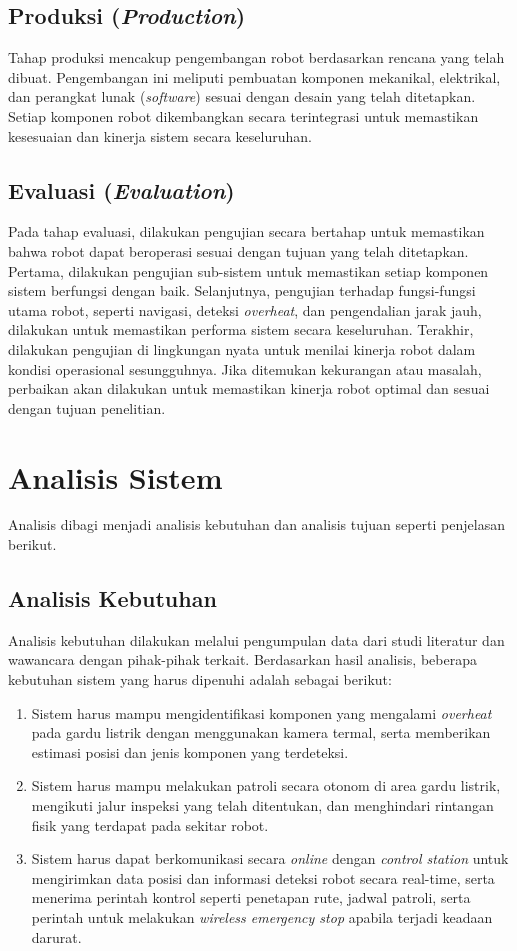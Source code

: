 \subsection{Produksi (\emph{Production})}
Tahap produksi mencakup pengembangan robot berdasarkan rencana yang telah dibuat. Pengembangan ini meliputi pembuatan komponen mekanikal, elektrikal, dan perangkat lunak (\emph{software}) sesuai dengan desain yang telah ditetapkan. Setiap komponen robot dikembangkan secara terintegrasi untuk memastikan kesesuaian dan kinerja sistem secara keseluruhan.

\subsection{Evaluasi (\emph{Evaluation})}
Pada tahap evaluasi, dilakukan pengujian secara bertahap untuk memastikan bahwa robot dapat beroperasi sesuai dengan tujuan yang telah ditetapkan. Pertama, dilakukan pengujian sub-sistem untuk memastikan setiap komponen sistem berfungsi dengan baik. Selanjutnya, pengujian terhadap fungsi-fungsi utama robot, seperti navigasi, deteksi \emph{overheat}, dan pengendalian jarak jauh, dilakukan untuk memastikan performa sistem secara keseluruhan. Terakhir, dilakukan pengujian di lingkungan nyata untuk menilai kinerja robot dalam kondisi operasional sesungguhnya. Jika ditemukan kekurangan atau masalah, perbaikan akan dilakukan untuk memastikan kinerja robot optimal dan sesuai dengan tujuan penelitian.


\section{Analisis Sistem}
Analisis dibagi menjadi analisis kebutuhan dan analisis tujuan seperti penjelasan berikut.

\subsection{Analisis Kebutuhan}
Analisis kebutuhan dilakukan melalui pengumpulan data dari studi literatur dan wawancara dengan pihak-pihak terkait. Berdasarkan hasil analisis, beberapa kebutuhan sistem yang harus dipenuhi adalah sebagai berikut:
\begin{enumerate}
  \item Sistem harus mampu mengidentifikasi komponen yang mengalami \emph{overheat} pada gardu listrik dengan menggunakan kamera termal, serta memberikan estimasi posisi dan jenis komponen yang terdeteksi.
  \item Sistem harus mampu melakukan patroli secara otonom di area gardu listrik, mengikuti jalur inspeksi yang telah ditentukan, dan menghindari rintangan fisik yang terdapat pada sekitar robot.
  \item Sistem harus dapat berkomunikasi secara \emph{online} dengan \emph{control station} untuk mengirimkan data posisi dan informasi deteksi robot secara real-time, serta menerima perintah kontrol seperti penetapan rute, jadwal patroli, serta perintah untuk melakukan \emph{wireless emergency stop} apabila terjadi keadaan darurat.
\end{enumerate}

